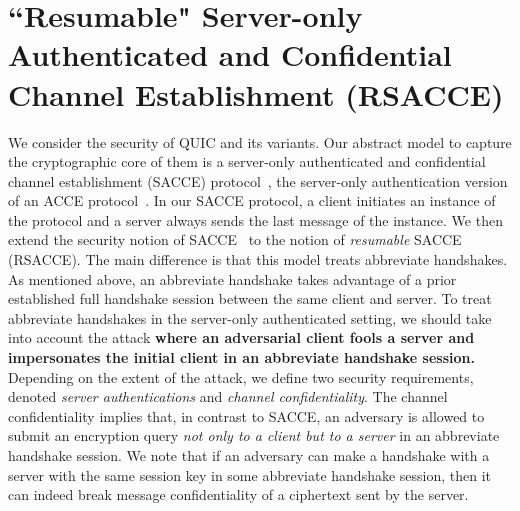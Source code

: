 \section{``Resumable" Server-only Authenticated and Confidential Channel Establishment (RSACCE)} \label{sec:rsacce}
We consider the security of QUIC and its variants.
Our abstract model to capture the cryptographic core of them is a server-only
authenticated and confidential channel establishment (SACCE) protocol~\cite{KPW13:SACCE},
the server-only authentication version of an ACCE protocol~\cite{JKSS12:ACCE}.
In our SACCE protocol, a client initiates an instance of the protocol and
a server always sends the last message of the instance.
We then extend the security notion of SACCE~\cite{KPW13:SACCE}
to the notion of \textit{resumable} SACCE (RSACCE).
The main difference is that this model treats abbreviate handshakes.
As mentioned above, an abbreviate handshake takes advantage
of a prior established full handshake session
between the same client and server.
To treat abbreviate handshakes in the server-only authenticated setting,
we should take into account the attack \textbf{where an adversarial client fools a server
and impersonates the initial client in an abbreviate handshake session.}
Depending on the extent of the attack, we define two security requirements,
denoted \textit{server authentications} and \textit{channel confidentiality}.
The channel confidentiality implies that, in contrast to SACCE,
an adversary is allowed to submit
an encryption query \textit{not only to a client but to a server} in an abbreviate handshake session.
We note that if an adversary can make a handshake with a server with the same session
key in some abbreviate handshake session, then it can indeed break message confidentiality of
a ciphertext sent by the server.

